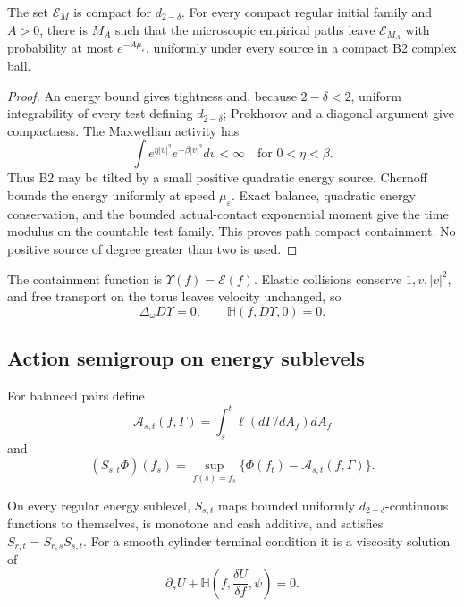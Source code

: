\begin{lemma}
\label{lem:r3-b4-containment}
The set \(\mathcal E_M\) is compact for \(d_{2-\delta}\).  For every compact
regular initial family and \(A>0\), there is \(M_A\) such that the microscopic
empirical paths leave \(\mathcal E_{M_A}\) with probability at most
\(e^{-A\mu_\varepsilon}\), uniformly under every source in a compact B2
complex ball.
\end{lemma}

\begin{proof}
An energy bound gives tightness and, because \(2-\delta<2\), uniform
integrability of every test defining \(d_{2-\delta}\); Prokhorov and a diagonal
argument give compactness.  The Maxwellian activity has
\[
 \int e^{\eta|v|^2}e^{-\beta|v|^2}dv<\infty
 \quad\text{for }0<\eta<\beta.
\]
Thus B2 may be tilted by a small positive quadratic energy source.  Chernoff
bounds the energy uniformly at speed \(\mu_\varepsilon\).  Exact balance,
quadratic energy conservation, and the bounded actual-contact exponential
moment give the time modulus on the countable test family.  This proves path
compact containment.  No positive source of degree greater than two is used.
\end{proof}

The containment function is
\(\Upsilon(f)=\mathcal E(f)\).  Elastic collisions conserve
\(1,v,|v|^2\), and free transport on the torus leaves velocity unchanged, so
\[
 \Delta_\omega D\Upsilon=0,
 \qquad
 \mathbb H(f,D\Upsilon,0)=0.
\]

\subsection{Action semigroup on energy sublevels}

For balanced pairs define
\[
 \mathcal A_{s,t}(f,\Gamma)
 =\int_s^t\ell(d\Gamma/dA_f)dA_f
\]
and
\[
 (S_{s,t}\Phi)(f_s)
 =\sup_{f(s)=f_s}
 \{\Phi(f_t)-\mathcal A_{s,t}(f,\Gamma)\}.
\]

\begin{theorem}
\label{thm:r3-b4-action}
On every regular energy sublevel, \(S_{s,t}\) maps bounded uniformly
\(d_{2-\delta}\)-continuous functions to themselves, is monotone and cash
additive, and satisfies
\(S_{r,t}=S_{r,s}S_{s,t}\).  For a smooth cylinder terminal condition it is a
viscosity solution of
\[
 \partial_sU+
 \mathbb H\left(f,\frac{\delta U}{\delta f},\psi\right)=0.
\]
\end{theorem}


